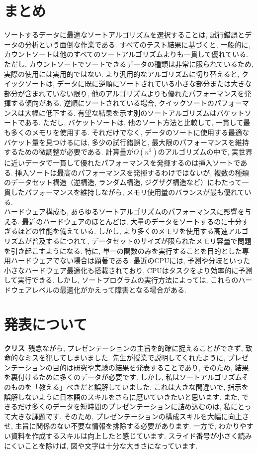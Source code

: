\documentclass[a4j, 11pt]{jarticle}
\begin{document}
\section{まとめ}
ソートするデータに最適なソートアルゴリズムを選択することは, 試行錯誤とデータの分析という面倒な作業である. すべてのテスト結果に基づくと, 一般的に, カウントソートは他のすべてのソートアルゴリズムよりも一貫して優れている. ただし, カウントソートでソートできるデータの種類は非常に限られているため, 実際の使用には実用的ではない. より汎用的なアルゴリズムに切り替えると, クイックソートは, データに既に逆順にソートされている小さな部分または大きな部分が含まれていない限り, 他のアルゴリズムよりも優れたパフォーマンスを発揮する傾向がある. 逆順にソートされている場合, クイックソートのパフォーマンスは大幅に低下する. 有望な結果を示す別のソートアルゴリズムはバケットソートである. ただし, バケットソートは, 他のソート方法と比較して, 一貫して最も多くのメモリを使用する. それだけでなく, データのソートに使用する最適なバケット量を見つけるには, 多少の試行錯誤と, 最大限のパフォーマンスを維持するための微調整が必要である. 計算量が$O(n^2)$のアルゴリズムの中で, 実世界に近いデータで一貫して優れたパフォーマンスを発揮するのは挿入ソートである. 挿入ソートは最高のパフォーマンスを発揮するわけではないが, 複数の種類のデータセット構造（逆構造, ランダム構造, ジグザグ構造など）にわたって一貫したパフォーマンスを維持しながら, メモリ使用量のバランスが最も優れている.\\

ハードウェア構成も, あらゆるソートアルゴリズムのパフォーマンスに影響を与える. 最近のハードウェアのほとんどは, 大量のデータをソートするのに十分すぎるほどの性能を備えている. しかし, より多くのメモリを使用する高速アルゴリズムが普及するにつれて, データセットのサイズが限られたメモリ容量で問題を引き起こすようになる. 特に, 単一の関数のみを実行することを目的とした専用ハードウェアでない場合は顕著である. 最近のCPUには, 予測や分岐といった小さなハードウェア最適化も搭載されており, CPUはタスクをより効率的に予測して実行できる. しかし, ソートプログラムの実行方法によっては, これらのハードウェアレベルの最適化がかえって障害となる場合がある.\\
\section{発表について}
\textbf{クリス}\
残念ながら, プレゼンテーションの主旨を的確に捉えることができず, 致命的なミスを犯してしまいました. 先生が授業で説明してくれたように, プレゼンテーションの目的は研究や実験の結果を発表することであり, そのため, 結果を裏付けるために多くのデータが必要です. しかし, 私はソートアルゴリズムそのものを「教える」べきだと誤解していました. これは大きな間違いで, 指示を誤解しないように日本語のスキルをさらに磨いていきたいと思います. また, できるだけ多くのデータを短時間のプレゼンテーションに詰め込むのは, 私にとって大きな課題です. そのため, プレゼンテーションの構成スキルを大幅に向上させ, 主旨に関係のない不要な情報を排除する必要があります. 一方で, わかりやすい資料を作成するスキルは向上したと感じています. スライド番号が小さく読みにくいことを除けば, 図や文字は十分な大きさになっています. 
\newpage


\newpage
\appendix
\renewcommand{\listtablename}{表の一覧}
\listoftables
\end{document}
